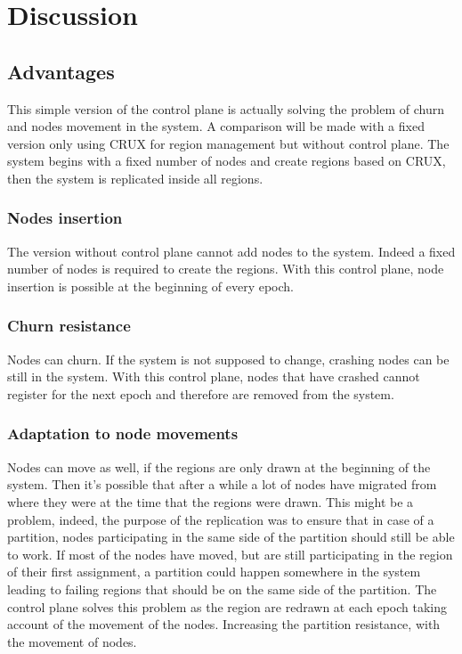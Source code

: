 \documentclass[a4paper,11pt,oneside]{report}
\begin{document}

\section{Discussion}
\subsection{Advantages}
This simple version of the control plane is actually solving the problem of
churn and nodes movement in the system. A comparison will be made with a fixed
version only using CRUX for region management but without control plane. The
system begins with a fixed number of nodes and create regions based on CRUX,
then the system is replicated inside all regions. 

\subsubsection{Nodes insertion}
The version without control plane cannot add nodes to the system. Indeed a
fixed number of nodes is required to create the regions. With this control
plane, node insertion is possible at the beginning of every epoch.


\subsubsection{Churn resistance}
Nodes can churn. If the system is not supposed to change, crashing nodes can be
still in the system. With this control plane, nodes that have crashed cannot
register for the next epoch and therefore are removed from the system. 


\subsubsection{Adaptation to node movements}
Nodes can move as well, if the regions are only drawn at the beginning of the
system. Then it's possible that after a while a lot of nodes have migrated from
where they were at the time that the regions were drawn. This might be a
problem, indeed, the purpose of the replication was to ensure that in case of a
partition, nodes participating in the same side of the partition should still
be able to work. If most of the nodes have moved, but are still participating
in the region of their first assignment, a partition could happen somewhere in
the system leading to failing regions that should be on the same side of the
partition. The control plane solves this problem as the region are redrawn at
each epoch taking account of the movement of the nodes. Increasing the
partition resistance, with the movement of nodes.
\end{document}
